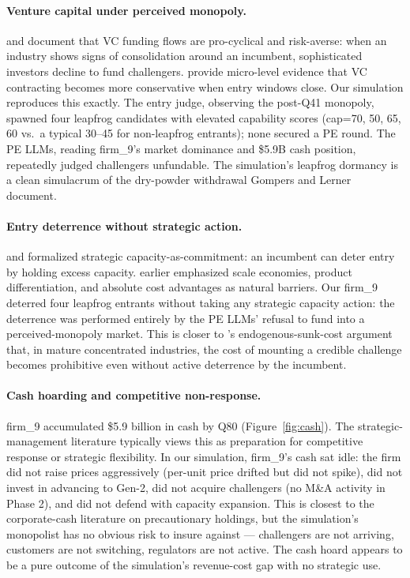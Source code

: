 \documentclass[11pt]{article}
\begin{document}
\paragraph{Venture capital under perceived monopoly.} \citet{Gompers1995} and \citet{GompersLerner2001} document that VC funding flows are pro-cyclical and risk-averse: when an industry shows signs of consolidation around an incumbent, sophisticated investors decline to fund challengers. \citet{KaplanStromberg2003} provide micro-level evidence that VC contracting becomes more conservative when entry windows close. Our simulation reproduces this exactly. The entry judge, observing the post-Q41 monopoly, spawned four leapfrog candidates with elevated capability scores (cap=70, 50, 65, 60 vs.\ a typical 30--45 for non-leapfrog entrants); none secured a PE round. The PE LLMs, reading firm\_9's market dominance and \$5.9B cash position, repeatedly judged challengers unfundable. The simulation's leapfrog dormancy is a clean simulacrum of the dry-powder withdrawal Gompers and Lerner document.

\paragraph{Entry deterrence without strategic action.} \citet{Dixit1980} and \citet{Spence1977} formalized strategic capacity-as-commitment: an incumbent can deter entry by holding excess capacity. \citet{Bain1956} earlier emphasized scale economies, product differentiation, and absolute cost advantages as natural barriers. Our firm\_9 deterred four leapfrog entrants without taking any strategic capacity action: the deterrence was performed entirely by the PE LLMs' refusal to fund into a perceived-monopoly market. This is closer to \citet{Sutton1991}'s endogenous-sunk-cost argument that, in mature concentrated industries, the cost of mounting a credible challenge becomes prohibitive even without active deterrence by the incumbent.

\paragraph{Cash hoarding and competitive non-response.} firm\_9 accumulated \$5.9 billion in cash by Q80 (Figure~\ref{fig:cash}). The strategic-management literature \citep{Porter1980,Ghemawat1991,Barney1991,Wernerfelt1984} typically views this as preparation for competitive response or strategic flexibility. In our simulation, firm\_9's cash sat idle: the firm did not raise prices aggressively (per-unit price drifted but did not spike), did not invest in advancing to Gen-2, did not acquire challengers (no M\&A activity in Phase 2), and did not defend with capacity expansion. This is closest to the corporate-cash literature \citep{BatesKahleStulz2009} on precautionary holdings, but the simulation's monopolist has no obvious risk to insure against --- challengers are not arriving, customers are not switching, regulators are not active. The cash hoard appears to be a pure outcome of the simulation's revenue-cost gap with no strategic use.
\end{document}
